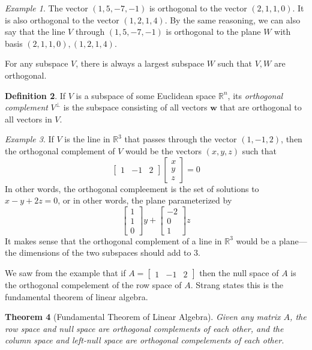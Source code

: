 \documentclass[11pt,oneside]{amsbook}
\newcommand{\R}{\mathbb R}
\theoremstyle{definition}
\theoremstyle{plain}
\newtheorem{theorem}{Theorem}[section]
\theoremstyle{definition}
\newtheorem{definition}[theorem]{Definition}
\theoremstyle{remark}
\newtheorem{example}[theorem]{Example}
\numberwithin{equation}{section}
\numberwithin{figure}{section}
\begin{document}
\begin{example}
  The vector $(1,5,-7,-1)$ is orthogonal to the vector $(2,1,1,0)$. It is also orthogonal to the vector $(1,2,1,4)$. By the same reasoning, we can also say that the line $V$ through $(1,5,-7,-1)$ is orthogonal to the plane $W$ with basis $(2,1,1,0),(1,2,1,4)$.
\end{example}

For any subspace $V$, there is always a largest subspace $W$ such that $V,W$ are orthogonal.

\begin{definition}
  If $V$ is a subspace of some Euclidean space $\R^n$, its \emph{orthogonal complement} $V^\perp$ is the subspace consisting of all vectors $\bm{w}$ that are orthogonal to all vectors in $V$.
\end{definition}

\begin{example}
  If $V$ is the line in $\R^3$ that passes through the vector $(1,-1,2)$, then the orthogonal complement of $V$ would be the vectors $(x,y,z)$ such that
  \[\begin{bmatrix}1&-1&2\end{bmatrix}
    \begin{bmatrix}x\\y\\z\end{bmatrix}=0
  \]
  In other words, the orthogonal compleement is the set of solutions to $x-y+2z=0$, or in other words, the plane parameterized by
  \[\begin{bmatrix}1\\1\\0\end{bmatrix}y
    +\begin{bmatrix}-2\\0\\1\end{bmatrix}z
  \]
  It makes sense that the orthogonal complement of a line in $\R^3$ would be a plane---the dimensions of the two subspaces should add to $3$.
\end{example}

We saw from the example that if $A=\begin{bmatrix}1&-1&2\end{bmatrix}$ then the null space of $A$ is the orthogonal compelement of the row space of $A$. Strang states this is the fundamental theorem of linear algebra.

\begin{theorem}[Fundamental Theorem of Linear Algebra]
  Given any matrix $A$, the row space and null space are orthogonal complements of each other, and the column space and left-null space are orthogonal compelements of each other.
\end{theorem}
\end{document}
